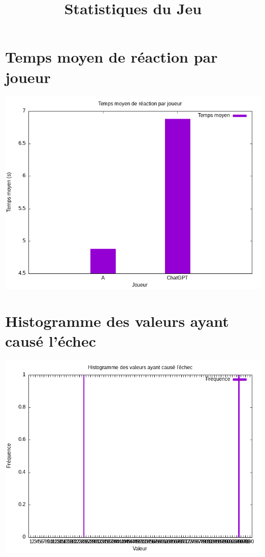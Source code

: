 \documentclass{article}
\title{Statistiques du Jeu}
\author{}
\date{}
\begin{document}
\maketitle

\section*{Temps moyen de réaction par joueur}
\includegraphics[width=\textwidth]{../Graphiques/temps_reaction_par_joueur.png}

\section*{Histogramme des valeurs ayant causé l'échec}
\includegraphics[width=\textwidth]{../Graphiques/valeurs_echec.png}
\end{document}
